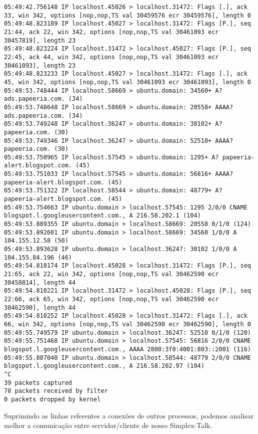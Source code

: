 \documentclass[a4paper,10pt]{article}
\begin{document}
\begin{lstlisting}
05:49:42.756148 IP localhost.45026 > localhost.31472: Flags [.], ack 33, win 342, options [nop,nop,TS val 30459576 ecr 30459576], length 0
05:49:48.823189 IP localhost.45027 > localhost.31472: Flags [P.], seq 21:44, ack 22, win 342, options [nop,nop,TS val 30461093 ecr 30457819], length 23
05:49:48.823224 IP localhost.31472 > localhost.45027: Flags [P.], seq 22:45, ack 44, win 342, options [nop,nop,TS val 30461093 ecr 30461093], length 23
05:49:48.823233 IP localhost.45027 > localhost.31472: Flags [.], ack 45, win 342, options [nop,nop,TS val 30461093 ecr 30461093], length 0
05:49:53.748444 IP localhost.58669 > ubuntu.domain: 34560+ A? ads.papeeria.com. (34)
05:49:53.748648 IP localhost.58669 > ubuntu.domain: 20558+ AAAA? ads.papeeria.com. (34)
05:49:53.749248 IP localhost.36247 > ubuntu.domain: 30102+ A? papeeria.com. (30)
05:49:53.749346 IP localhost.36247 > ubuntu.domain: 52510+ AAAA? papeeria.com. (30)
05:49:53.750965 IP localhost.57545 > ubuntu.domain: 1295+ A? papeeria-alert.blogspot.com. (45)
05:49:53.751033 IP localhost.57545 > ubuntu.domain: 56816+ AAAA? papeeria-alert.blogspot.com. (45)
05:49:53.751322 IP localhost.58544 > ubuntu.domain: 48779+ A? papeeria-alert.blogspot.com. (45)
05:49:53.754663 IP ubuntu.domain > localhost.57545: 1295 2/0/0 CNAME blogspot.l.googleusercontent.com., A 216.58.202.1 (104)
05:49:53.889355 IP ubuntu.domain > localhost.58669: 20558 0/1/0 (124)
05:49:53.892601 IP ubuntu.domain > localhost.58669: 34560 1/0/0 A 104.155.12.58 (50)
05:49:53.893628 IP ubuntu.domain > localhost.36247: 30102 1/0/0 A 104.155.84.196 (46)
05:49:54.810174 IP localhost.45028 > localhost.31472: Flags [P.], seq 21:65, ack 22, win 342, options [nop,nop,TS val 30462590 ecr 30458814], length 44
05:49:54.810221 IP localhost.31472 > localhost.45028: Flags [P.], seq 22:66, ack 65, win 342, options [nop,nop,TS val 30462590 ecr 30462590], length 44
05:49:54.810252 IP localhost.45028 > localhost.31472: Flags [.], ack 66, win 342, options [nop,nop,TS val 30462590 ecr 30462590], length 0
05:49:55.749579 IP ubuntu.domain > localhost.36247: 52510 0/1/0 (120)
05:49:55.751468 IP ubuntu.domain > localhost.57545: 56816 2/0/0 CNAME blogspot.l.googleusercontent.com., AAAA 2800:3f0:4001:803::2001 (116)
05:49:55.807040 IP ubuntu.domain > localhost.58544: 48779 2/0/0 CNAME blogspot.l.googleusercontent.com., A 216.58.202.97 (104)
^C
39 packets captured
78 packets received by filter
0 packets dropped by kernel

\end{lstlisting}

Suprimindo as linhas referentes a conexões de outros processos, podemos analisar melhor a comunicação entre servidor/cliente de nosso Simplex-Talk.
\end{document}
